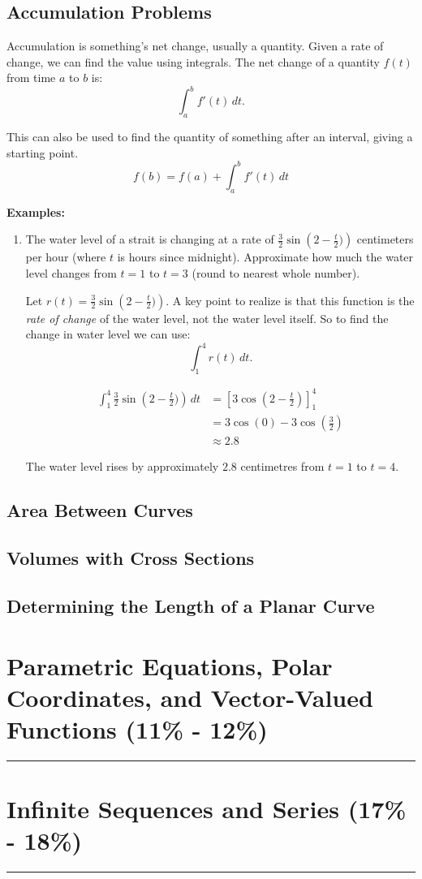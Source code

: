 \documentclass[12pt]{article}
\newcommand{\fline}{\par\noindent\rule{\textwidth}{0.1pt}} %
\begin{document}
        \subsection{Accumulation Problems}
            Accumulation is something's net change, usually a quantity. Given a rate of change, we can find the value using integrals. The net change of a quantity $f(t)$ from time $a$ to $b$ is:
            \[ \int_{a}^{b} f'(t) \, dt. \]

            This can also be used to find the quantity of something after an interval, giving a starting point.
            \[ f(b) = f(a) + \int_{a}^{b} f'(t) \, dt \]

            \noindent \textbf{Examples:}
            \begin{enumerate}
                \item The water level of a strait is changing at a rate of $\frac{3}{2} \sin \left(2- \frac{t}{2}) \right)$ centimeters per hour (where $t$ is hours since midnight). Approximate how much the water level changes from $t=1$ to $t=3$ (round to nearest whole number).

                Let $r(t) = \frac{3}{2} \sin \left(2- \frac{t}{2}) \right)$. A key point to realize is that this function is the \textit{rate of change} of the water level, not the water level itself. So to find the change in water level we can use:
                \[ \int_{1}^{4} r(t) \, dt. \]

                \begin{align*}
                    \int_{1}^{4} \frac{3}{2} \sin \left(2- \frac{t}{2}) \right) \, dt &= \left[ 3 \cos \left(2 - \frac{t}{2} \right) \right]_1^4 \\[6pt]
                    &= 3 \cos(0) - 3\cos \left( \frac{3}{2} \right) \\[6pt]
                    &\approx 2.8
                \end{align*}

                The water level rises by approximately $2.8$ centimetres from $t=1$ to $t=4$.

            \end{enumerate}

        \subsection{Area Between Curves}

        \subsection{Volumes with Cross Sections}

        \subsection{Determining the Length of a Planar Curve}

    \section{Parametric Equations, Polar Coordinates, and Vector-Valued Functions (11\% - 12\%)}
    \fline

    \section{Infinite Sequences and Series (17\% - 18\%)}
    \fline
\end{document}
